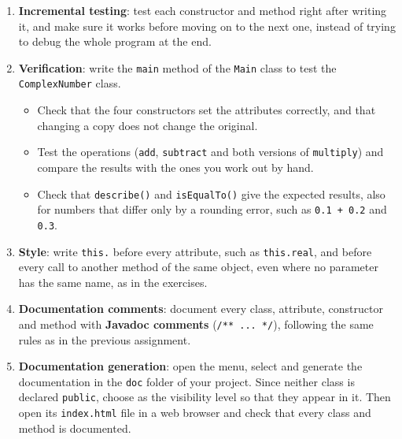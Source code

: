 \begin{enumerate}

    \item \textbf{Incremental testing}: test each constructor and method right after writing it, and make sure it works before moving on to the next one, instead of trying to debug the whole program at the end.

    \item \textbf{Verification}: write the \texttt{main} method of the \texttt{Main} class to test the \texttt{ComplexNumber} class.

        \begin{itemize}

            \item Check that the four constructors set the attributes correctly, and that changing a copy does not change the original.

            \item Test the operations (\texttt{add}, \texttt{subtract} and both versions of \texttt{multiply}) and compare the results with the ones you work out by hand.

            \item Check that \texttt{describe()} and \texttt{isEqualTo()} give the expected results, also for numbers that differ only by a rounding error, such as \texttt{0.1 + 0.2} and \texttt{0.3}.

        \end{itemize}

    \item \textbf{Style}: write \texttt{this.} before every attribute, such as \texttt{this.real}, and before every call to another method of the same object, even where no parameter has the same name, as in the exercises.

    \item \textbf{Documentation comments}: document every class, attribute, constructor and method with \textbf{Javadoc comments} (\texttt{/** ... */}), following the same rules as in the previous assignment.

    \item \textbf{Documentation generation}: open the  menu, select  and generate the documentation in the \texttt{doc} folder of your project. Since neither class is declared \texttt{public}, choose  as the visibility level so that they appear in it. Then open its \texttt{index.html} file in a web browser and check that every class and method is documented.

\end{enumerate}

